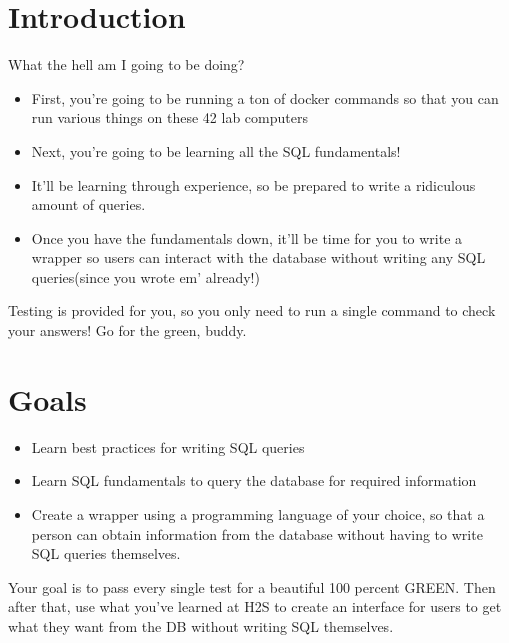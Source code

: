 \documentclass{42-en}
\begin{document}
\chapter{Introduction}

	What the hell am I going to be doing?

	\begin{itemize}\itemsep1pt
		\item First, you're going to be running a ton of docker commands 
			so that you can run various things on these 42 lab computers
		\item Next, you're going to be learning all the SQL fundamentals! 
		\item It'll be learning through experience, so be prepared to write 
			a ridiculous amount of queries. 
		\item Once you have the fundamentals down, it'll be time for you to 
			write a wrapper so users can interact with the database 
			without writing any SQL queries(since you wrote em' already!) 
	\end{itemize}


	Testing is provided for you, so you only need to run a single command to 
	check your answers! Go for the green, buddy. 

\chapter{Goals}

	\begin{itemize}\itemsep1pt 
		\item Learn best practices for writing SQL queries   
		\item Learn SQL fundamentals to query the database for required information 
		\item Create a wrapper using a programming language of your choice, so 
			that a person can obtain information from the database without 
			having to write SQL queries themselves.
	\end{itemize}

	Your goal is to pass every single test for a beautiful 100 percent GREEN. Then 
	after that, use what you've learned at H2S to create an interface for users 
	to get what they want from the DB without writing SQL themselves. 
\end{document}
